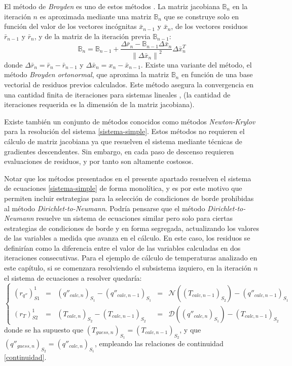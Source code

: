 El método de \textit{Broyden} es uno de estos métodos \cite{broyden}.
La matriz jacobiana $\mathbb{B}_n$ en la iteración $n$ es aproximada mediante una matriz $\mathbb{B}_n$ que se construye solo en función 
del valor de los vectores incógnitas $\bar{x}_{n-1}$ y $\bar{x}_{n}$,
de los vectores residuos $\bar{r}_{n-1}$ y $\bar{r}_{n}$,
y de la matriz de la iteración previa $\mathbb{B}_{n-1}$:
\begin{equation}
\mathbb{B}_n = \mathbb{B}_{n-1} + \frac{\Delta{\bar{r}_n}-\mathbb{B}_{n-1}\Delta{\bar{x}_n}}{\left \| \Delta{\bar{x}_n} \right \| ^2}\Delta{\bar{x}}_n^T
\label{broyden}
\end{equation}
donde $\Delta{\bar{r}_n}=\bar{r}_n - \bar{r}_{n-1}$ y $\Delta{\bar{x}_n}=x_n - \bar{x}_{n-1}$.
Existe una variante del método, el método \textit{Broyden ortonormal}, que aproxima la matriz $\mathbb{B}_n$ en función de una base vectorial de residuos previos calculados.
Este método asegura la convergencia en una cantidad finita de iteraciones para sistemas lineales \cite{broyden-on}, (la cantidad de iteraciones requerida es la dimensión de la matriz jacobiana).

Existe también un conjunto de métodos conocidos como métodos \textit{Newton-Krylov} para la resolución del sistema \ref{sistema-simple}. Estos métodos no requieren el cálculo de matriz jacobiana ya que resuelven el sistema mediante técnicas de gradientes descendentes. Sin embargo, en cada paso de descenso requieren evaluaciones de residuos, y por tanto son altamente costosos.

Notar que los métodos presentados en el presente apartado resuelven el sistema de ecuaciones \ref{sistema-simple} de forma monolítica,
y es por este motivo que permiten incluir estrategias para la selección de condiciones de borde prohibidas al método \textit{Dirichlet-to-Neumann}.
Podría pensarse que el método \textit{Dirichlet-to-Neumann} resuelve un sistema de ecuaciones similar pero solo para ciertas estrategias de condiciones de borde y en forma segregada,
actualizando los valores de las variables a medida que avanza en el cálculo.
En este caso, los residuos se definirían como la diferencia entre el valor de las variables calculadas en dos iteraciones consecutivas.
Para el ejemplo de cálculo de temperaturas analizado en este capítulo, si se comenzara resolviendo el subsistema izquiero, en la iteración $n$ el sistema de ecuaciones a resolver quedaría:
\begin{equation}
\left\{ \begin{array}{rcccl}
(r_{q''})_{S1}^{1} &=& (q''_{calc,n})_{S_1} - (q''_{calc,n-1})_{S_1} &=&\mathscr{N}\left(\left(T_{calc,n-1}\right )_{S_2}\right) - (q''_{calc,n-1})_{S_1} \\
(r_{T})_{S2}^{1} &=& (T_{calc,n})_{S_2} - (T_{calc,n-1})_{S_2} &=& \mathscr{D}\left(\left(q''_{calc,n}\right )_{S_1} \right ) - (T_{calc,n-1})_{S_2}
\end{array}\right.
\label{res_qt}
\end{equation}
donde se ha supuesto que $\left(T_{guess,n}\right )_{S_1}=\left(T_{calc,n-1}\right )_{S_2}$,
y que $\left(q''_{guess,n}\right )_{S_2}=\left(q''_{calc,n}\right )_{S_1}$,
empleando las relaciones de continuidad \ref{continuidad}.

